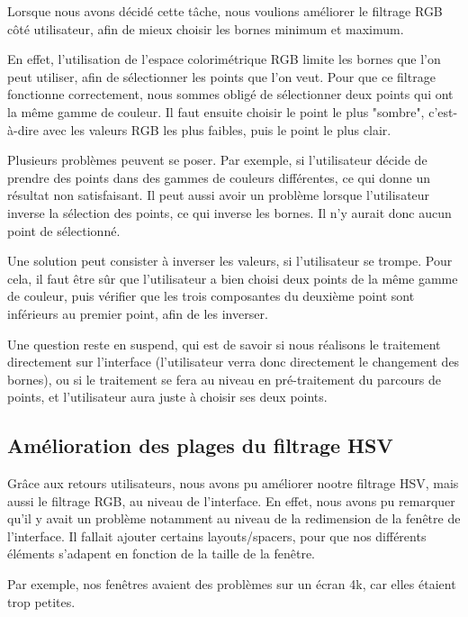 \documentclass[12pt,titlepage,french]{article}
\begin{document}
Lorsque nous avons décidé cette tâche, nous voulions améliorer le filtrage RGB côté utilisateur, afin de mieux choisir les bornes minimum et maximum. \newline

En effet, l'utilisation de l'espace colorimétrique RGB limite les bornes que l'on peut utiliser, afin de sélectionner les points que l'on veut. Pour que ce filtrage fonctionne correctement, nous sommes obligé de sélectionner deux points qui ont la même gamme de couleur. Il faut ensuite choisir le point le plus "sombre", c'est-à-dire avec les valeurs RGB les plus faibles, puis le point le plus clair. \newline

Plusieurs problèmes peuvent se poser. Par exemple, si l'utilisateur décide de prendre des points dans des gammes de couleurs différentes, ce qui donne un résultat non satisfaisant. Il peut aussi avoir un problème lorsque l'utilisateur inverse la sélection des points, ce qui inverse les bornes. Il n'y aurait donc aucun point de sélectionné. \newline

Une solution peut consister à inverser les valeurs, si l'utilisateur se trompe. Pour cela, il faut être sûr que l'utilisateur a bien choisi deux points de la même gamme de couleur, puis vérifier que les trois composantes du deuxième point sont inférieurs au premier point, afin de les inverser. \newline

Une question reste en suspend, qui est de savoir si nous réalisons le traitement directement sur l'interface (l'utilisateur verra donc directement le changement des bornes), ou si le traitement se fera au niveau en pré-traitement du parcours de points, et l'utilisateur aura juste à choisir ses deux points.

\subsection{Amélioration des plages du filtrage HSV}

Grâce aux retours utilisateurs, nous avons pu améliorer nootre filtrage HSV, mais aussi le filtrage RGB, au niveau de l'interface. En effet, nous avons pu remarquer qu'il y avait un problème notamment au niveau de la redimension de la fenêtre de l'interface. Il fallait ajouter certains layouts/spacers, pour que nos différents éléments s'adapent en fonction de la taille de la fenêtre. 

Par exemple, nos fenêtres avaient des problèmes sur un écran 4k, car elles étaient trop petites.
\end{document}
